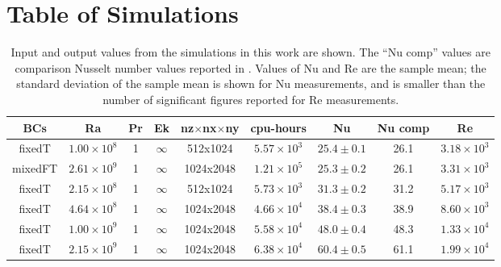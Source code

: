 \documentclass[aps, pre, onecolumn, nofootinbib, notitlepage, groupedaddress, amsfonts, amssymb, amsmath, longbibliography]{revtex4-1}
\begin{document}


\appendix
\section{Table of Simulations}
\label{app:table}


\begin{table}[ht]
\caption{
	Input and output values from the simulations in this work are shown.
	The ``Nu comp'' values are comparison Nusselt number values reported in \cite{zhu&all2018}.
	Values of Nu and Re are the sample mean; the standard deviation of the sample mean is shown for Nu measurements, and is smaller than the number of significant figures reported for Re measurements.
}
\setlength{\tabcolsep}{12pt}
\label{table:speed}
\begin{center}
\begin{tabularx}{\textwidth}{c c c c c c c c c}
\hline																	
BCs	&	Ra	&	Pr	&	Ek	&	nz$\times$nx$\times$ny	&	cpu-hours &	Nu	&	Nu comp	&	Re \\
\hline
fixedT	&	$1.00 \times 10^8$	&	1	&	$\infty$	&	512x1024	&	$5.57 \times 10^3$	&	$25.4 \pm 0.1$	&	26.1	&	$3.18 \times 10^3$ \\
mixedFT	&	$2.61 \times 10^9$	&	1	&	$\infty$	&	1024x2048	&	$1.21 \times 10^5$	&	$25.3 \pm 0.2$	&	26.1	&	$3.31 \times 10^3$ \\
fixedT	&	$2.15 \times 10^8$	&	1	&	$\infty$	&	512x1024	&	$5.73 \times 10^3$	&	$31.3 \pm 0.2$	&	31.2	&	$5.17 \times 10^3$ \\
fixedT	&	$4.64 \times 10^8$	&	1	&	$\infty$	&	1024x2048	&	$4.66 \times 10^4$	&	$38.4 \pm 0.3$	&	38.9	&	$8.60 \times 10^3$ \\
fixedT	&	$1.00 \times 10^9$	&	1	&	$\infty$	&	1024x2048	&	$5.58 \times 10^4$	&	$48.0 \pm 0.4$	&	48.3	&	$1.33 \times 10^4$ \\
fixedT	&	$2.15 \times 10^9$	&	1	&	$\infty$	&	1024x2048	&	$6.38 \times 10^4$	&	$60.4 \pm 0.5$	&	61.1	&	$1.99 \times 10^4$ \\
\hline																	
\end{tabularx}
\end{center}
\end{table}
\end{document}
